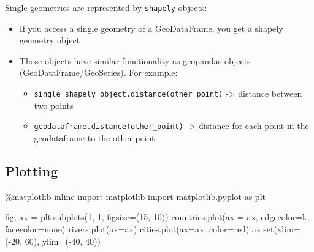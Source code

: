 \documentclass[
  letterpaper,
  DIV=11,
  numbers=noendperiod]{scrreprt}
\newenvironment{Shaded}{\begin{snugshade}}{\end{snugshade}}
\newcommand{\BuiltInTok}[1]{\textcolor[rgb]{0.00,0.23,0.31}{#1}}
\newcommand{\DecValTok}[1]{\textcolor[rgb]{0.68,0.00,0.00}{#1}}
\newcommand{\ImportTok}[1]{\textcolor[rgb]{0.00,0.46,0.62}{#1}}
\newcommand{\NormalTok}[1]{\textcolor[rgb]{0.00,0.23,0.31}{#1}}
\newcommand{\OperatorTok}[1]{\textcolor[rgb]{0.37,0.37,0.37}{#1}}
\newcommand{\StringTok}[1]{\textcolor[rgb]{0.13,0.47,0.30}{#1}}
\providecommand{\tightlist}{%
  \setlength{\itemsep}{0pt}\setlength{\parskip}{0pt}}\usepackage{longtable,booktabs,array}
\begin{document}
Single geometries are represented by \texttt{shapely} objects:

\begin{itemize}
\tightlist
\item
  If you access a single geometry of a GeoDataFrame, you get a shapely
  geometry object
\item
  Those objects have similar functionality as geopandas objects
  (GeoDataFrame/GeoSeries). For example:

  \begin{itemize}
  \tightlist
  \item
    \texttt{single\_shapely\_object.distance(other\_point)}
    -\textgreater{} distance between two points
  \item
    \texttt{geodataframe.distance(other\_point)} -\textgreater{}
    distance for each point in the geodataframe to the other point
  \end{itemize}
\end{itemize}

\hypertarget{plotting}{%
\subsection{Plotting}\label{plotting}}

\begin{Shaded}
\begin{Highlighting}[]
\OperatorTok{\%}\NormalTok{matplotlib inline}
\ImportTok{import}\NormalTok{ matplotlib}
\ImportTok{import}\NormalTok{ matplotlib.pyplot }\ImportTok{as}\NormalTok{ plt}

\NormalTok{fig, ax }\OperatorTok{=}\NormalTok{ plt.subplots(}\DecValTok{1}\NormalTok{, }\DecValTok{1}\NormalTok{, figsize}\OperatorTok{=}\NormalTok{(}\DecValTok{15}\NormalTok{, }\DecValTok{10}\NormalTok{))}
\NormalTok{countries.plot(ax }\OperatorTok{=}\NormalTok{ ax, edgecolor}\OperatorTok{=}\StringTok{\textquotesingle{}k\textquotesingle{}}\NormalTok{, facecolor}\OperatorTok{=}\StringTok{\textquotesingle{}none\textquotesingle{}}\NormalTok{)}
\NormalTok{rivers.plot(ax}\OperatorTok{=}\NormalTok{ax)}
\NormalTok{cities.plot(ax}\OperatorTok{=}\NormalTok{ax, color}\OperatorTok{=}\StringTok{\textquotesingle{}red\textquotesingle{}}\NormalTok{)}
\NormalTok{ax.}\BuiltInTok{set}\NormalTok{(xlim}\OperatorTok{=}\NormalTok{(}\OperatorTok{{-}}\DecValTok{20}\NormalTok{, }\DecValTok{60}\NormalTok{), ylim}\OperatorTok{=}\NormalTok{(}\OperatorTok{{-}}\DecValTok{40}\NormalTok{, }\DecValTok{40}\NormalTok{))}
\end{Highlighting}
\end{Shaded}
\end{document}
